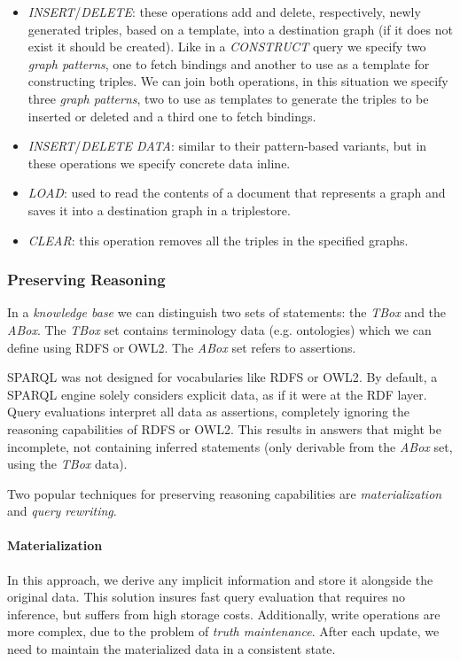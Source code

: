 \begin{itemize}
    \item \emph{INSERT}/\emph{DELETE}: these operations add and delete, respectively, newly generated triples, based on a template, into a destination graph (if it does not exist it should be created). Like in a \emph{CONSTRUCT} query we specify two \emph{graph patterns}, one to fetch bindings and another to use as a template for constructing triples. We can join both operations, in this situation we specify three \emph{graph patterns}, two to use as templates to generate the triples to be inserted or deleted and a third one to fetch bindings.
    \item \emph{INSERT}/\emph{DELETE DATA}: similar to their pattern-based variants, but in these operations we specify concrete data inline.
    \item \emph{LOAD}: used to read the contents of a document that represents a graph and saves it into a destination graph in a triplestore.
    \item \emph{CLEAR}: this operation removes all the triples in the specified graphs. 
\end{itemize}

\subsubsection{Preserving Reasoning}

In a \emph{knowledge base} we can distinguish two sets of statements: the \emph{TBox} and the \emph{ABox}. The \emph{TBox} set contains terminology data (e.g. ontologies) which we can define using \gls{RDFS} or \gls{OWL2}. The \emph{ABox} set refers to assertions.

\gls{SPARQL} was not designed for vocabularies like \gls{RDFS} or \gls{OWL2}. By default, a \gls{SPARQL} engine solely considers explicit data, as if it were at the \gls{RDF} layer. Query evaluations interpret all data as assertions, completely ignoring the reasoning capabilities of \gls{RDFS} or \gls{OWL2}. This results in answers that might be incomplete, not containing inferred statements (only derivable from the \emph{ABox} set, using the \emph{TBox} data).

Two popular techniques for preserving reasoning capabilities are \emph{materialization} and \emph{query rewriting}.

\paragraph{Materialization} In this approach, we derive any implicit information and store it alongside the original data. This solution insures fast query evaluation that requires no inference, but suffers from high storage costs. Additionally, write operations are more complex, due to the problem of \emph{truth maintenance}. After each update, we need to maintain the materialized data in a consistent state. 

